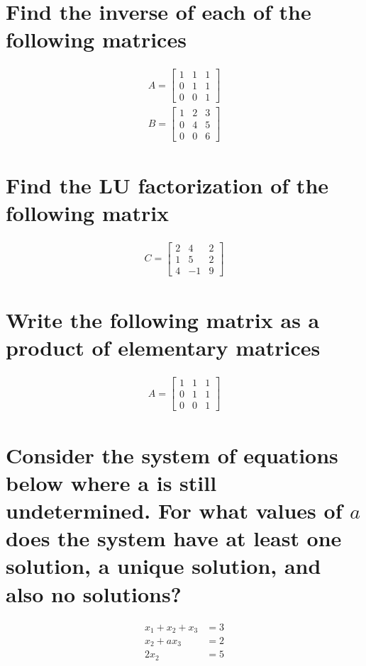 \documentclass{assignment}
\begin{document}
\section{Find the inverse of each of the following matrices}
\begin{align}
  A = \begin{bmatrix}
    1 & 1 & 1 \\
    0 & 1 & 1 \\
    0 & 0 & 1
  \end{bmatrix} \\
  B = \begin{bmatrix}
    1 & 2 & 3 \\
    0 & 4 & 5 \\
    0 & 0 & 6
  \end{bmatrix}
\end{align}

\newpage

\section{Find the LU factorization of the following matrix}
\begin{align}
  C = \begin{bmatrix}
    2 & 4 & 2 \\
    1 & 5 & 2 \\
    4 & -1 & 9
  \end{bmatrix}
\end{align}

\newpage

\section{Write the following matrix as a product of elementary matrices}
\begin{align}
  A = \begin{bmatrix}
    1 & 1 & 1 \\
    0 & 1 & 1 \\
    0 & 0 & 1
  \end{bmatrix}
\end{align}

\newpage

\section{Consider the system of equations below where a is still undetermined. For what values of $a$ does the system have at least one solution, a unique solution, and also no solutions?}
\begin{align}
  x_1 + x_2 + x_3 &= 3 \\
  x_2  +ax_3 &= 2 \\
  2x_2 &= 5
\end{align}
\end{document}

